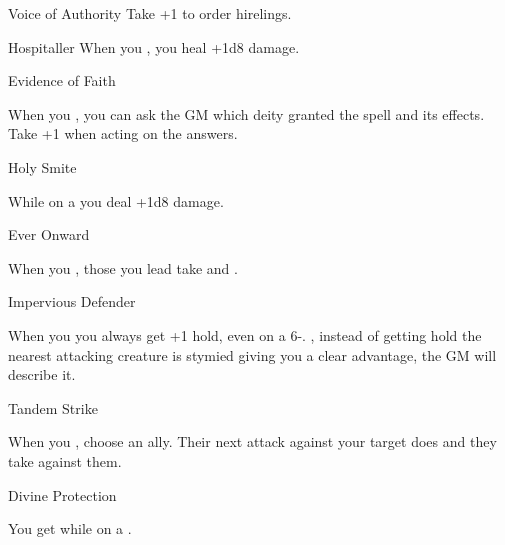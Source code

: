 \documentclass[8pt]{extarticle}
\begin{document}
\begin{multicols}{2}
\begin{amove}{Voice of Authority}
  Take +1 to order hirelings.
\end{amove}

\begin{amove}{Hospitaller}
  When you , you heal +1d8 damage.
\end{amove}


\vfill\null
\columnbreak

\secondAdvances

\begin{amove}{Evidence of Faith}

  When you , you can ask the
  GM which deity granted the spell and its effects. Take +1 when
  acting on the answers.
\end{amove}

\begin{amove}{Holy Smite}

  While on a  you deal +1d8 damage.
\end{amove}

\begin{amove}{Ever Onward}

  When you , those you lead
  take  and .
\end{amove}

\begin{amove}{Impervious Defender}

  When you  you always get +1 hold, even on a
  6-. , instead of getting hold the
  nearest attacking creature is stymied giving you a clear advantage,
  the GM will describe it.
\end{amove}

\begin{amove}{Tandem Strike}

  When you , choose an ally. Their next attack
  against your target does  and they take 
  against them.
\end{amove}

\begin{amove}{Divine Protection}

  You get  while on a .
\end{amove}


\end{multicols}
\end{document}
